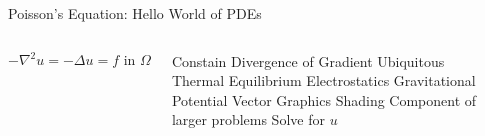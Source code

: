 \placelogofalse
\begin{frame}{Poisson's Equation: Hello World of PDEs}
\begin{columns}
  $$
    -\nabla^2 u = -\Delta u = f \text{ in } \Omega
  $$

\begin{outline}
  \1 Constain Divergence of Gradient
  \1 Ubiquitous 
  \2 Thermal Equilibrium
  \2 Electrostatics
  \2 Gravitational Potential
  \2 Vector Graphics Shading
  \2 Component of larger problems
  \1 Solve for $u$
\end{outline}


\begin{center}
\centering


\vspace{0.2cm}




\end{center}
\end{columns}
\end{frame}
\placelogotrue
